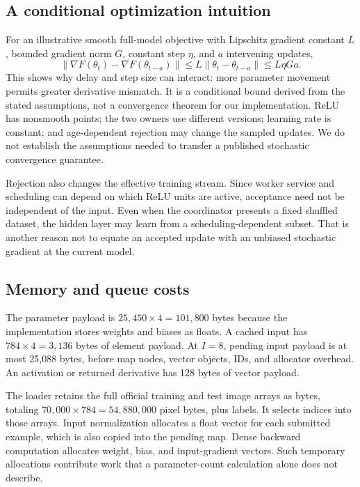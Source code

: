 \documentclass[conference]{IEEEtran}
\begin{document}
\subsection{A conditional optimization intuition}
For an illustrative smooth full-model objective with Lipschitz gradient constant $L$, bounded gradient norm $G$, constant step $\eta$, and $a$ intervening updates,
\begin{equation}
 \|\nabla F(\theta_t)-\nabla F(\theta_{t-a})\|
 \leq L\|\theta_t-\theta_{t-a}\|\leq L\eta Ga.
\end{equation}
This shows why delay and step size can interact: more parameter movement permits greater derivative mismatch. It is a conditional bound derived from the stated assumptions, not a convergence theorem for our implementation. ReLU has nonsmooth points; the two owners use different versions; learning rate is constant; and age-dependent rejection may change the sampled updates. We do not establish the assumptions needed to transfer a published stochastic convergence guarantee.

Rejection also changes the effective training stream. Since worker service and scheduling can depend on which ReLU units are active, acceptance need not be independent of the input. Even when the coordinator presents a fixed shuffled dataset, the hidden layer may learn from a scheduling-dependent subset. That is another reason not to equate an accepted update with an unbiased stochastic gradient at the current model.

\subsection{Memory and queue costs}
The parameter payload is $25{,}450\times4=101{,}800$ bytes because the implementation stores weights and biases as floats. A cached input has $784\times4=3{,}136$ bytes of element payload. At $I=8$, pending input payload is at most 25,088 bytes, before map nodes, vector objects, IDs, and allocator overhead. An activation or returned derivative has 128 bytes of vector payload.

The loader retains the full official training and test image arrays as bytes, totaling $70{,}000\times784=54{,}880{,}000$ pixel bytes, plus labels. It selects indices into those arrays. Input normalization allocates a float vector for each submitted example, which is also copied into the pending map. Dense backward computation allocates weight, bias, and input-gradient vectors. Such temporary allocations contribute work that a parameter-count calculation alone does not describe.
\end{document}
